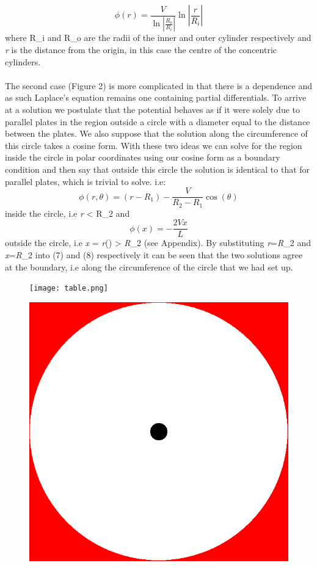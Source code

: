 \documentclass{article}
\begin{document}
\begin{equation}
\phi(r)=\frac{V}{\ln\left|\frac{R_o}{R_i}\right|}\ln\left|\frac{r}{R_i}\right|
\label{29}
\end{equation}
where R_i\) and R_o\) are the radii of the inner and outer cylinder respectively and \textit{r} is the distance from the origin, in this case the centre of the concentric cylinders. \\
\\
The second case (Figure 2) is more complicated in that there is a \theta\) dependence and as such Laplace's equation remains one containing partial differentials. To arrive at a solution we postulate that the potential behaves as if it were solely due to parallel plates in the region outside a circle with a diameter equal to the distance between the plates. We also suppose that the solution along the circumference of this circle takes a cosine form. With these two ideas we can solve for the region inside the circle in polar coordinates using our cosine form as a boundary condition and then say that outside this circle the solution is identical to that for parallel plates, which is trivial to solve. i.e: 
\begin{equation}
\phi(r,\theta)=(r-R_1)-\frac{V}{R_2-R_1}\cos(\theta)
\label{}
\end{equation}
inside the circle, i.e \textit{r} < R_2\) and
\begin{equation}
\phi(x)=-\frac{2Vx}{L}
\label{}
\end{equation}
outside the circle, i.e \textit{x} = \textit{r}\cos(\theta)\) > \textit{R}_2\) (see Appendix). By substituting \textit{r}=\textit{R}_2\) and \textit{x}=\textit{R}_2\cos\theta\) into (7) and (8) respectively it can be seen that the two solutions agree at the boundary, i.e along the circumference of the circle that we had set up. 

\begin{figure}
\centering
\begin{minipage}{.5\textwidth}
  \centering
  \texttt{[image: table.png]}
  \label{fig:test1}
\end{minipage}%
\begin{minipage}{.5\textwidth}
  \centering
  \includegraphics[width=.6\linewidth]{prob0HR.png}
  \label{fig:test2}
\end{minipage}
\end{figure}
\end{document}

